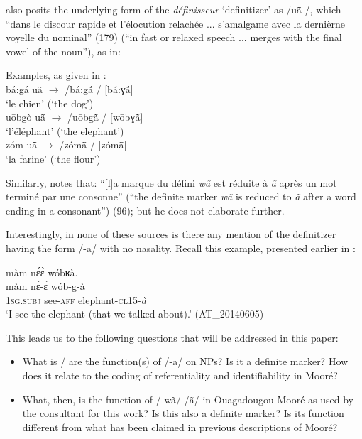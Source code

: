 \documentclass[output=paper]{langsci/langscibook}
\begin{document}
\cite{canu1974} also posits the underlying form of the \textit{définisseur} ‘definitizer’ as /uã\={} /, which “dans le discour rapide et l’élocution relachée ... s’amalgame avec la dernièrne voyelle du nominal” (179) (“in fast or relaxed speech ... merges with the final vowel of the noun”), as in:

\ea\label{ex:teo:12}
Examples, as given in \citet[179]{canu1974}:\\
bá:gá u\={ã}  \textup{${\rightarrow}$}\textup{ /bá:g\'{ã} / [bá:ɣ\'{ã}]} \\
‘le chien’ (‘the dog’)\\

u\={o}bgò u\={ã}  \textup{${\rightarrow}$}\textup{ /u\={o}bg\`{ã} / [w\={o}bɣ\`{ã}]} \\
‘l’éléphant’ (‘the elephant’)\\

zóm u\={ã}  \textup{${\rightarrow}$}\textup{ /zóm\={ã} / [zóm\={ã}]} \\
‘la farine’ (‘the flour’)
\z

Similarly, \cite{Nikiema1989} notes that: “[l]a marque du défini \textit{wã} est réduite à \textit{ã} après un mot terminé par une consonne” (“the definite marker \textit{wã} is reduced to \textit{ã} after a word ending in a consonant”) (96); but he does not elaborate further.

Interestingly, in none of these sources is there any mention of the definitizer having the form /-a/ with no nasality. Recall this example, presented earlier in :

\ea\label{ex:teo:4repeated}
\glll màm n\'ɛ\`ɛ wóbʁà.\\
 màm n\'ɛ-\`ɛ wób-g-à\\
\textsc{1sg.subj} see-\textsc{aff} elephant-\textsc{cl15-}\textit{à} \\
\glt ‘I see the elephant (that we talked about).’ (AT\_20140605)
\z

This leads us to the following questions that will be addressed in this paper:
 
\begin{itemize}[noitemsep]
	\item What is / are the function(s) of /-a/ on NPs? Is it a definite marker? How does it relate to the coding of referentiality and identifiability in Mooré?
\item What, then, is the function of /-wã/ {\Tilde} /ã/ in Ouagadougou Mooré as used by the consultant for this work? Is this also a definite marker? Is its function different from what has been claimed in previous descriptions of Mooré?
\end{itemize}
\end{document}

